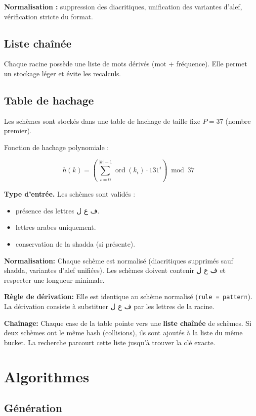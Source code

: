 \documentclass[11pt,a4paper]{article}
\begin{document}
\textbf{Normalisation :}
suppression des diacritiques, unification des variantes d’alef, vérification stricte du format.

\subsection{Liste chaînée}

Chaque racine possède une liste de mots dérivés (mot + fréquence).  
Elle permet un stockage léger et évite les recalculs.

\subsection{Table de hachage}

Les schèmes sont stockés dans une table de hachage de taille fixe $P=37$ (nombre premier).  

Fonction de hachage polynomiale :

\[
h(k)=\left(\sum_{i=0}^{|k|-1} \operatorname{ord}(k_i)\cdot131^i\right)\bmod 37
\]

\textbf{Type d’entrée.} 
Les schèmes sont validés :
\begin{itemize}
    \item présence des lettres \textarabic{ف ع ل}.
    \item lettres arabes uniquement.
    \item conservation de la shadda (si présente).
\end{itemize}

\textbf{Normalisation:}
Chaque schème est normalisé (diacritiques supprimés sauf shadda, variantes d’alef unifiées).  
Les schèmes doivent contenir \textarabic{ف ع ل} et respecter une longueur minimale.

\textbf{Règle de dérivation:} Elle est identique au schème normalisé (\texttt{rule = pattern}).  
La dérivation consiste à substituer \textarabic{ف ع ل} par les lettres de la racine.

\textbf{Chaînage:} Chaque case de la table pointe vers une \textbf{liste chaînée} de schèmes.  
Si deux schèmes ont le même hash (collisions), ils sont ajoutés à la liste du même bucket.  
La recherche parcourt cette liste jusqu’à trouver la clé exacte.


\section{Algorithmes}

\subsection{Génération}
\end{document}
